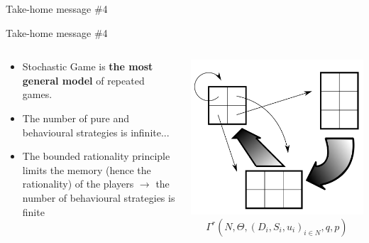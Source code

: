 
\begin{frame}{Take-home message \#4}

    \begin{block}{Take-home message \#4}
        \begin{columns}
            \begin{column}{0.55\textwidth}
                \begin{itemize}
                    \item Stochastic Game is \textbf{the most general model} of
                    repeated games.
                    \item {\color{orange}The number of pure and behavioural strategies is infinite}...
                    \item The bounded rationality principle limits the memory (hence
                    the rationality) of the players
                    $\to$ {\color{green}the number of behavioural strategies is finite}
                \end{itemize}
            \end{column}
            \begin{column}{0.3\textwidth}
                \begin{center}
                    \includegraphics[width=\textwidth]{img/stochastic.png}
                    \scriptsize{\[ \Gamma^r(N, \Theta, (D_i, S_i, u_i)_{i \in N}, q, p) \]}
                \end{center}
            \end{column}
        \end{columns}

    \end{block}
\end{frame}
